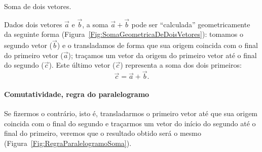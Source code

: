 \begin{marginfigure}[2cm]
\centering
{}
\caption{Soma de dois vetores.\label{Fig:SomaGeometricaDeDoisVetores}}
\end{marginfigure}

Dados dois vetores $\vec{a}$ e $\vec{b}$, a soma $\vec{a}+\vec{b}$ pode ser ``calculada'' geometricamente da seguinte forma (Figura~\ref{Fig:SomaGeometricaDeDoisVetores}): tomamos o segundo vetor ($\vec{b}$) e o transladamos de forma que sua origem coincida com o final do primeiro vetor ($\vec{a}$); traçamos um vetor da origem do primeiro vetor até o final do segundo ($\vec{c}$). Este último vetor ($\vec{c}$) representa a soma dos dois primeiros:
\begin{equation}
    \vec{c} = \vec{a} + \vec{b}.
\end{equation}

\paragraph{Comutatividade, regra do paralelogramo}

Se fizermos o contrário, isto é, transladarmos o primeiro vetor até que sua origem coincida com o final do segundo e traçarmos um vetor do início do segundo até o final do primeiro, veremos que o resultado obtido será o mesmo (Figura~\ref{Fig:RegraParalelogramoSoma}).

